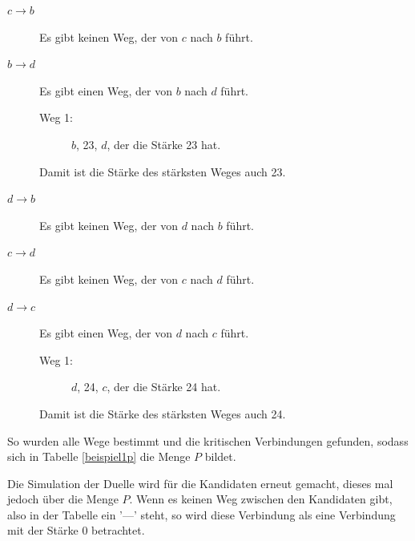 \begin{description}
\item[$c \to b$] Es gibt keinen Weg, der von $c$ nach $b$ führt.

\item[$b \to d$] Es gibt einen Weg, der von $b$ nach $d$ führt.
	\begin{description}
	\item[Weg 1:] $b$, 23, $d$, der die Stärke 23 hat.
	\end{description}
	Damit ist die Stärke des stärksten Weges auch 23.
	
\item[$d \to b$] Es gibt keinen Weg, der von $d$ nach $b$ führt.

\item[$c \to d$] Es gibt keinen Weg, der von $c$ nach $d$ führt.
	
\item[$d \to c$] Es gibt einen Weg, der von $d$ nach $c$ führt.
	\begin{description}
	\item[Weg 1:] $d$, 24, $c$, der die Stärke 24 hat.
	\end{description}
	Damit ist die Stärke des stärksten Weges auch 24.	
\end{description}

So wurden alle Wege bestimmt und die kritischen Verbindungen gefunden, sodass sich in Tabelle \ref{beispiel1p} die Menge $P$ bildet.



Die Simulation der Duelle wird für die Kandidaten erneut gemacht, dieses mal jedoch über die Menge $P$. Wenn es keinen Weg zwischen den Kandidaten gibt, also in der Tabelle ein '---' steht, so wird diese Verbindung als eine Verbindung mit der Stärke 0 betrachtet.

